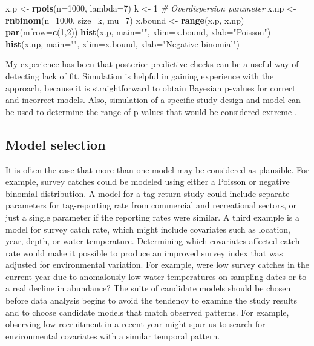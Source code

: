\documentclass[
]{krantz}
\makeatletter
\newenvironment{Shaded}{\begin{snugshade}}{\end{snugshade}}
\newcommand{\AttributeTok}[1]{\textcolor[rgb]{0.27,0.27,0.27}{#1}}
\newcommand{\CommentTok}[1]{\textcolor[rgb]{0.37,0.37,0.37}{\textit{#1}}}
\newcommand{\DecValTok}[1]{\textcolor[rgb]{0.06,0.06,0.06}{#1}}
\newcommand{\FunctionTok}[1]{\textcolor[rgb]{0.27,0.27,0.27}{\textbf{#1}}}
\newcommand{\NormalTok}[1]{#1}
\newcommand{\OtherTok}[1]{\textcolor[rgb]{0.37,0.37,0.37}{#1}}
\newcommand{\StringTok}[1]{\textcolor[rgb]{0.5,0.5,0.5}{#1}}
\newenvironment{kframe}{%
\medskip{}
\setlength{\fboxsep}{.8em}
 \def\at@end@of@kframe{}%
 \ifinner\ifhmode%
  \def\at@end@of@kframe{\end{minipage}}%
  \begin{minipage}{\columnwidth}%
 \fi\fi%
 \def\FrameCommand##1{\hskip\@totalleftmargin \hskip-\fboxsep
 \colorbox{shadecolor}{##1}\hskip-\fboxsep
     \hskip-\linewidth \hskip-\@totalleftmargin \hskip\columnwidth}%
 \MakeFramed {\advance\hsize-\width
   \@totalleftmargin\z@ \linewidth\hsize
   \@setminipage}}%
 {\par\unskip\endMakeFramed%
 \at@end@of@kframe}
\renewenvironment{Shaded}{\begin{kframe}}{\end{kframe}}
\makeatother
\begin{document}
\begin{Shaded}
\begin{Highlighting}[]
\NormalTok{x.p }\OtherTok{\textless{}{-}} \FunctionTok{rpois}\NormalTok{(}\AttributeTok{n=}\DecValTok{1000}\NormalTok{, }\AttributeTok{lambda=}\DecValTok{7}\NormalTok{)}
\NormalTok{k }\OtherTok{\textless{}{-}} \DecValTok{1} \CommentTok{\# Overdispersion parameter}
\NormalTok{x.np }\OtherTok{\textless{}{-}} \FunctionTok{rnbinom}\NormalTok{(}\AttributeTok{n=}\DecValTok{1000}\NormalTok{, }\AttributeTok{size=}\NormalTok{k, }\AttributeTok{mu=}\DecValTok{7}\NormalTok{)}
\NormalTok{x.bound }\OtherTok{\textless{}{-}} \FunctionTok{range}\NormalTok{(x.p, x.np)}
\FunctionTok{par}\NormalTok{(}\AttributeTok{mfrow=}\FunctionTok{c}\NormalTok{(}\DecValTok{1}\NormalTok{,}\DecValTok{2}\NormalTok{))}
\FunctionTok{hist}\NormalTok{(x.p, }\AttributeTok{main=}\StringTok{""}\NormalTok{, }\AttributeTok{xlim=}\NormalTok{x.bound, }\AttributeTok{xlab=}\StringTok{"Poisson"}\NormalTok{)}
\FunctionTok{hist}\NormalTok{(x.np, }\AttributeTok{main=}\StringTok{""}\NormalTok{, }\AttributeTok{xlim=}\NormalTok{x.bound, }\AttributeTok{xlab=}\StringTok{"Negative binomial"}\NormalTok{)}
\end{Highlighting}
\end{Shaded}

My experience has been that posterior predictive checks can be a useful way of detecting lack of fit. Simulation is helpful in gaining experience with the approach, because it is straightforward to obtain Bayesian p-values for correct and incorrect models. Also, simulation of a specific study design and model can be used to determine the range of p-values that would be considered extreme \citep{conn.etal_2018}.

\hypertarget{Model-selection}{%
\subsection{Model selection}\label{Model-selection}}

It is often the case that more than one model may be considered as plausible. For example, survey catches could be modeled using either a Poisson or negative binomial distribution. A model for a tag-return study could include separate parameters for tag-reporting rate from commercial and recreational sectors, or just a single parameter if the reporting rates were similar. A third example is a model for survey catch rate, which might include covariates such as location, year, depth, or water temperature. Determining which covariates affected catch rate would make it possible to produce an improved survey index that was adjusted for environmental variation. For example, were low survey catches in the current year due to anomalously low water temperatures on sampling dates or to a real decline in abundance? The suite of candidate models should be chosen before data analysis begins \citep{burnham.anderson_1998} to avoid the tendency to examine the study results and to choose candidate models that match observed patterns. For example, observing low recruitment in a recent year might spur us to search for environmental covariates with a similar temporal pattern.
\end{document}
